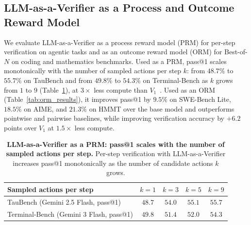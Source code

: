 \subsection{LLM-as-a-Verifier as a Process and Outcome Reward Model}
\label{app:prm-orm}

We evaluate LLM-as-a-Verifier as a process reward model (PRM) for per-step verification on agentic tasks and as an outcome reward model (ORM) for Best-of-$N$ on coding and mathematics benchmarks. Used as a PRM, pass@1 scales monotonically with the number of sampled actions per step $k$: from $48.7\%$ to $55.7\%$ on TauBench and from $49.8\%$ to $54.3\%$ on Terminal-Bench as $k$ grows from $1$ to $9$ (Table~\ref{tab:prm_results}), at $3\times$ less compute than $V_1$~\citep{singh_v_1_2026}. Used as an ORM (Table~\ref{tab:orm_results}), it improves pass@1 by $9.5\%$ on SWE-Bench Lite, $18.5\%$ on AIME, and $21.3\%$ on HMMT over the base model and outperforms pointwise and pairwise baselines, while improving verification accuracy by $+6.2$ points over $V_1$ at $1.5\times$ less compute.

\begin{table}[!ht]
    \centering
    \caption{\textbf{LLM-as-a-Verifier as a PRM: pass@1 scales with the number of sampled actions per step.} Per-step verification with LLM-as-a-Verifier increases pass@1 monotonically as the number of candidate actions $k$ grows.}
    \label{tab:prm_results}
    \small
    \begin{tabular}{lcccc}
    \toprule
    Sampled actions per step & $k{=}1$ & $k{=}3$ & $k{=}5$ & $k{=}9$ \\
    \midrule
    TauBench (Gemini 2.5 Flash, pass@1)        & $48.7$ & $54.0$ & $55.1$ & $\mathbf{55.7}$ \\
    Terminal-Bench (Gemini 3 Flash, pass@1)    & $49.8$ & $51.4$ & $52.0$ & $\mathbf{54.3}$ \\
    \bottomrule
    \end{tabular}
\end{table}

